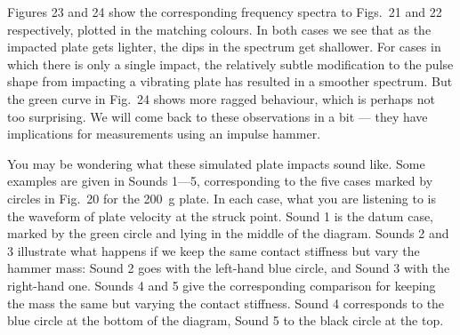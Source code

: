 
  Figures 23 and 24 show the corresponding frequency spectra to Figs.\ 21 and 
  22 respectively, plotted in the matching colours. In both cases we see that 
  as the impacted plate gets lighter, the dips in the spectrum get shallower. 
  For cases in which there is only a single impact, the relatively subtle 
  modification to the pulse shape from impacting a vibrating plate has resulted 
  in a smoother spectrum. But the green curve in Fig.\ 24 shows more ragged 
  behaviour, which is perhaps not too surprising. We will come back to these 
  observations in a bit — they have implications for measurements using an 
  impulse hammer. 



  You may be wondering what these simulated plate impacts sound like. Some 
  examples are given in Sounds 1—5, corresponding to the five cases marked by 
  circles in Fig.\ 20 for the 200~g plate. In each case, what you are listening 
  to is the waveform of plate velocity at the struck point. Sound 1 is the 
  datum case, marked by the green circle and lying in the middle of the 
  diagram. Sounds 2 and 3 illustrate what happens if we keep the same contact 
  stiffness but vary the hammer mass: Sound 2 goes with the left-hand blue 
  circle, and Sound 3 with the right-hand one. Sounds 4 and 5 give the 
  corresponding comparison for keeping the mass the same but varying the 
  contact stiffness. Sound 4 corresponds to the blue circle at the bottom of 
  the diagram, Sound 5 to the black circle at the top. 


